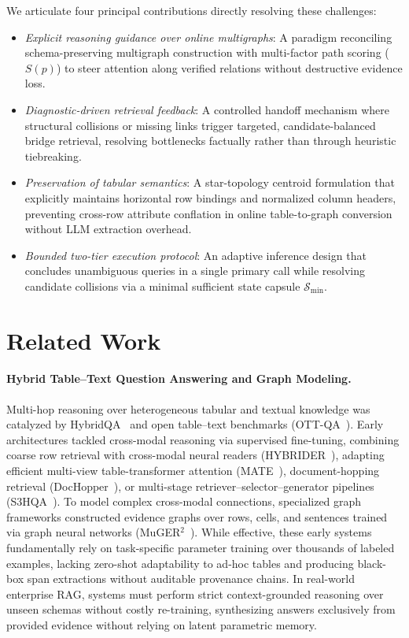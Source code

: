 \documentclass[runningheads]{llncs}
\begin{document}
We articulate four principal contributions directly resolving these challenges:
\begin{itemize}
    \item \emph{Explicit reasoning guidance over online multigraphs}: A paradigm reconciling schema-preserving multigraph construction with multi-factor path scoring ($S(p)$) to steer attention along verified relations without destructive evidence loss.
    \item \emph{Diagnostic-driven retrieval feedback}: A controlled handoff mechanism where structural collisions or missing links trigger targeted, candidate-balanced bridge retrieval, resolving bottlenecks factually rather than through heuristic tiebreaking.
    \item \emph{Preservation of tabular semantics}: A star-topology centroid formulation that explicitly maintains horizontal row bindings and normalized column headers, preventing cross-row attribute conflation in online table-to-graph conversion without LLM extraction overhead.
    \item \emph{Bounded two-tier execution protocol}: An adaptive inference design that concludes unambiguous queries in a single primary call while resolving candidate collisions via a minimal sufficient state capsule $\mathcal{S}_{\min}$.
\end{itemize}

\section{Related Work}
\label{sec:related}



\paragraph{Hybrid Table--Text Question Answering and Graph Modeling.}
Multi-hop reasoning over heterogeneous tabular and textual knowledge was catalyzed by HybridQA~\cite{hybridqa} and open table--text benchmarks (OTT-QA~\cite{chen2021ottqa}). Early architectures tackled cross-modal reasoning via supervised fine-tuning, combining coarse row retrieval with cross-modal neural readers (HYBRIDER~\cite{hybridqa}), adapting efficient multi-view table-transformer attention (MATE~\cite{eisenschlos2021mate}), document-hopping retrieval (DocHopper~\cite{sun2021dochopper}), or multi-stage retriever--selector--generator pipelines (S3HQA~\cite{lei2023s3hqa}). To model complex cross-modal connections, specialized graph frameworks constructed evidence graphs over rows, cells, and sentences trained via graph neural networks (MuGER$^2$~\cite{wang2022muger2}). While effective, these early systems fundamentally rely on task-specific parameter training over thousands of labeled examples, lacking zero-shot adaptability to ad-hoc tables and producing black-box span extractions without auditable provenance chains. In real-world enterprise RAG, systems must perform strict context-grounded reasoning over unseen schemas without costly re-training, synthesizing answers exclusively from provided evidence without relying on latent parametric memory.
\end{document}
